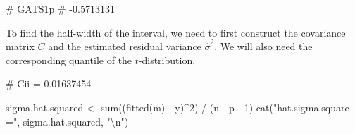 \documentclass[
  a4paper,
]{article}
\newenvironment{Shaded}{\begin{snugshade}}{\end{snugshade}}
\newcommand{\DecValTok}[1]{\textcolor[rgb]{0.00,0.00,0.81}{#1}}
\newcommand{\FunctionTok}[1]{\textcolor[rgb]{0.00,0.00,0.00}{#1}}
\newcommand{\NormalTok}[1]{#1}
\newcommand{\OtherTok}[1]{\textcolor[rgb]{0.56,0.35,0.01}{#1}}
\newcommand{\SpecialCharTok}[1]{\textcolor[rgb]{0.00,0.00,0.00}{#1}}
\newcommand{\StringTok}[1]{\textcolor[rgb]{0.31,0.60,0.02}{#1}}
\theoremstyle{definition}
\theoremstyle{definition}
\theoremstyle{definition}
\theoremstyle{definition}
\theoremstyle{remark}
\begin{document}
\begin{Shaded}
\begin{Highlighting}[]
\NormalTok{\#     GATS1p }
\NormalTok{\# {-}0.5713131}
\end{Highlighting}
\end{Shaded}

To find the half-width of the interval, we need to first construct the
covariance matrix \(C\) and the estimated residual variance \(\hat\sigma^2\).
We will also need the corresponding quantile of the \(t\)-distribution.

\begin{Shaded}
\end{Shaded}

\begin{Shaded}
\begin{Highlighting}[]
\NormalTok{\# Cii = 0.01637454}
\end{Highlighting}
\end{Shaded}

\begin{Shaded}
\begin{Highlighting}[]
\NormalTok{sigma.hat.squared }\OtherTok{\textless{}{-}} \FunctionTok{sum}\NormalTok{((}\FunctionTok{fitted}\NormalTok{(m) }\SpecialCharTok{{-}}\NormalTok{ y)}\SpecialCharTok{\^{}}\DecValTok{2}\NormalTok{) }\SpecialCharTok{/}\NormalTok{ (n }\SpecialCharTok{{-}}\NormalTok{ p }\SpecialCharTok{{-}} \DecValTok{1}\NormalTok{)}
\FunctionTok{cat}\NormalTok{(}\StringTok{"hat.sigma.square ="}\NormalTok{, sigma.hat.squared, }\StringTok{"}\SpecialCharTok{\textbackslash{}n}\StringTok{"}\NormalTok{)}
\end{Highlighting}
\end{Shaded}
\end{document}
